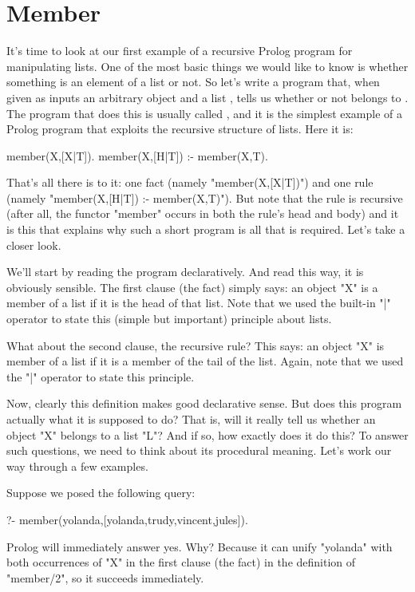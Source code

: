 \section{Member}\label{SEC.L4.MEMBER}

It's time to look at our first example of a recursive Prolog program
for manipulating lists.  One of the most basic things we would like to
know is whether something is an element of a list or not.  So let's
write a program that, when given as inputs an arbitrary object
 and a list , tells us whether or not
 belongs to .  The program that does this is
usually called , and it is the simplest example of a
Prolog program that exploits the recursive structure of lists.  Here
it is:


\begin{LPNcodedisplay}
member(X,[X|T]).
member(X,[H|T]) :- member(X,T).
\end{LPNcodedisplay}


That's all there is to it: one fact (namely "member(X,[X|T])")
and one rule (namely "member(X,[H|T]) :- member(X,T)"). But note
that the rule is recursive (after all, the functor "member"
occurs in both the rule's head and body) and it is this that explains
why such a short program is all that is required.
Let's take a closer look.

We'll start by reading the program declaratively. And read this way,
it is obviously sensible.  The first clause (the fact) simply says: an
object "X" is a member of a list if it is the head of that list.
Note that we used the built-in "|" operator to state this (simple
but important) principle about lists.

What about the second clause, the recursive rule?  This says: an
object "X" is member of a list if it is a member of the tail of
the list.  Again, note that we used the "|" operator to state
this principle.

Now, clearly this definition makes good declarative sense.  But does
this program actually  what it is supposed to do?  That is,
will it really tell us whether an object "X" belongs to a list
"L"? And if so, how exactly does it do this?  To answer such
questions, we need to think about its procedural meaning.  Let's work
our way through a few examples.

Suppose we posed the following query:

\begin{LPNcodedisplay}
?- member(yolanda,[yolanda,trudy,vincent,jules]).
\end{LPNcodedisplay}
Prolog will immediately answer yes.  Why?  Because it can unify
"yolanda" with both occurrences of "X" in the first clause
(the fact) in the definition of "member/2", so it succeeds
immediately.

